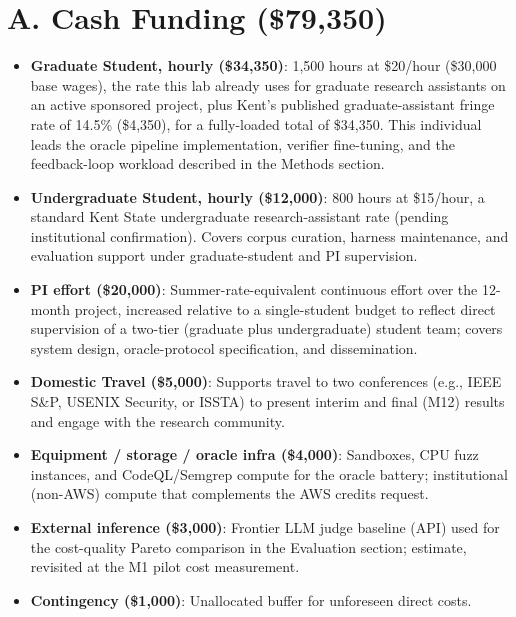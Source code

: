 \documentclass[11pt]{article}
\begin{document}
\section*{A. Cash Funding (\$79,350)}
\begin{itemize}[leftmargin=1.3em, itemsep=0.5ex, topsep=2pt]
\item \textbf{Graduate Student, hourly (\$34,350)}: 1,500 hours at \$20/hour (\$30,000 base wages), the rate this lab already uses for graduate research assistants on an active sponsored project, plus Kent's published graduate-assistant fringe rate of 14.5\% (\$4,350), for a fully-loaded total of \$34,350. This individual leads the oracle pipeline implementation, verifier fine-tuning, and the feedback-loop workload described in the Methods section.
\item \textbf{Undergraduate Student, hourly (\$12,000)}: 800 hours at \$15/hour, a standard Kent State undergraduate research-assistant rate (pending institutional confirmation). Covers corpus curation, harness maintenance, and evaluation support under graduate-student and PI supervision.
\item \textbf{PI effort (\$20,000)}: Summer-rate-equivalent continuous effort over the 12-month project, increased relative to a single-student budget to reflect direct supervision of a two-tier (graduate plus undergraduate) student team; covers system design, oracle-protocol specification, and dissemination.
\item \textbf{Domestic Travel (\$5,000)}: Supports travel to two conferences (e.g., IEEE S\&P, USENIX Security, or ISSTA) to present interim and final (M12) results and engage with the research community.
\item \textbf{Equipment / storage / oracle infra (\$4,000)}: Sandboxes, CPU fuzz instances, and CodeQL/Semgrep compute for the oracle battery; institutional (non-AWS) compute that complements the AWS credits request.
\item \textbf{External inference (\$3,000)}: Frontier LLM judge baseline (API) used for the cost-quality Pareto comparison in the Evaluation section; estimate, revisited at the M1 pilot cost measurement.
\item \textbf{Contingency (\$1,000)}: Unallocated buffer for unforeseen direct costs.
\end{itemize}
\end{document}
